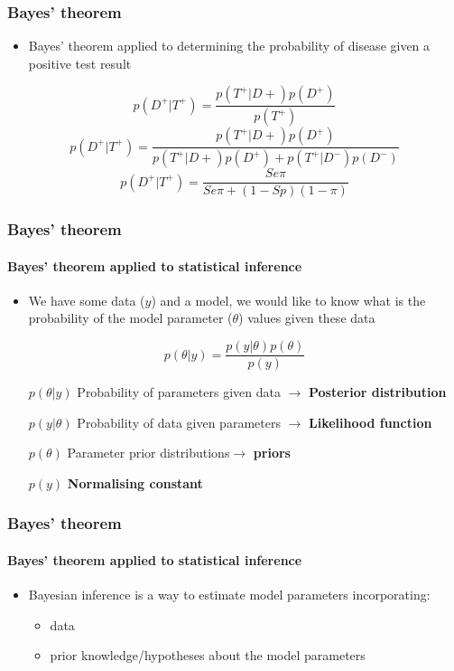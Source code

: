 \documentclass{beamer}
\begin{document}
\begin{frame}
\frametitle{Bayes’ theorem}
\begin{itemize}
 \item{Bayes’ theorem applied to determining the probability of disease given a positive test result}
\end{itemize}
\vspace{.5cm}
$$p(D^+|T^+)=\frac{p(T^+|D+)p(D^+)}{p(T^+)}$$
\pause
\vspace{.5cm}
$$p(D^+|T^+)=\frac{p(T^+|D+)p(D^+)}{p(T^+|D+)p(D^+)+p(T^+|D^-)p(D^-)}$$
\pause
\vspace{.5cm}
$$p(D^+|T^+)=\frac{Se \pi}{Se \pi + (1-Sp)(1-\pi)}$$
\end{frame}


\begin{frame}
\frametitle{Bayes’ theorem}
\framesubtitle{Bayes’ theorem applied to statistical inference}
 \begin{itemize}
  \item{We have some data ($y$) and a model, we would like to know what is the probability of the model parameter ($\theta$) values given these data}
 \end{itemize}
\begin{large}
$$p(\theta|y)=\frac{p(y|\theta)p(\theta)}{p(y)}$$
\end{large}
\begin{itemize}
 \item[$p(\theta|y)$]{Probability of parameters given data $\rightarrow$ \textbf{Posterior distribution}}
 \item[$p(y|\theta)$]{Probability of data given parameters $\rightarrow$ \textbf{Likelihood function}}
 \item[$p(\theta)$]{Parameter prior distributions$\rightarrow$ \textbf{priors}}
 \item[$p(y)$]{\textbf{Normalising constant}}
 \end{itemize}
\end{frame}

\begin{frame}
\frametitle{Bayes’ theorem}
\framesubtitle{Bayes’ theorem applied to statistical inference}
 \begin{itemize}
  \item{Bayesian inference is a way to estimate model parameters incorporating:}
 \begin{itemize}
  \item{data}
  \item{prior knowledge/hypotheses about the model parameters}
 \end{itemize}
\end{itemize}
\end{frame}
\end{document}
